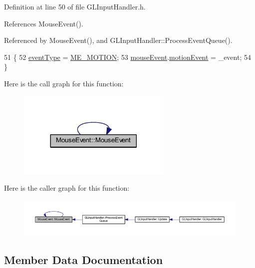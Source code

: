 Definition at line 50 of file G\+L\+Input\+Handler.\+h.



References Mouse\+Event().



Referenced by Mouse\+Event(), and G\+L\+Input\+Handler\+::\+Process\+Event\+Queue().


\begin{DoxyCode}
51   \{
52     \hyperlink{struct_mouse_event_ae6bdad847363f462a57f8be893fd620c}{eventType} = \hyperlink{_g_l_input_handler_8h_aeb86fa74ca9837fffb1d216966d74e0fab88552d2119ce3914095501fe17f5762}{ME\_MOTION};
53     \hyperlink{struct_mouse_event_a75d3e0b8d1c30db9650221cf0769704d}{mouseEvent}.\hyperlink{union_s_d_l___m_o_u_s_e___e_v_e_n_t_af8459d7e4e5e53b2caf6e39db087f17c}{motionEvent} = \_event;
54   \}
\end{DoxyCode}


Here is the call graph for this function\+:\nopagebreak
\begin{figure}[H]
\begin{center}
\leavevmode
\includegraphics[width=209pt]{struct_mouse_event_afefc615a5438d68b47ee155197f58842_cgraph}
\end{center}
\end{figure}




Here is the caller graph for this function\+:\nopagebreak
\begin{figure}[H]
\begin{center}
\leavevmode
\includegraphics[width=350pt]{struct_mouse_event_afefc615a5438d68b47ee155197f58842_icgraph}
\end{center}
\end{figure}




\subsection{Member Data Documentation}
